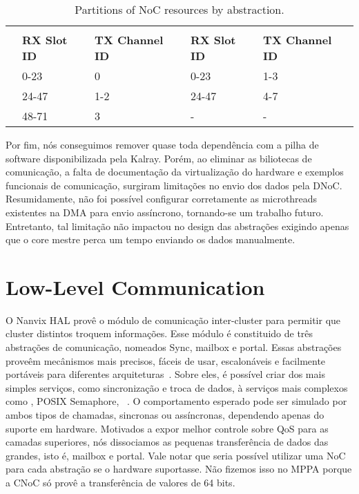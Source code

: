 		\begin{table}[!tb]
			\centering%
			\caption{Partitions of NoC resources by abstraction.}%
			\label{tab.noc-resources}%

			\begin{tabular}{l|l|l|l|l|}
				\cline{2-5}
														& \multicolumn{2}{c|}{\textbf{\cnoc}}          & \multicolumn{2}{c|}{\textbf{\dnoc}}          \\ \cline{2-5}
														& \textbf{RX Slot ID} & \textbf{TX Channel ID} & \textbf{RX Slot ID} & \textbf{TX Channel ID} \\ \hline
				\multicolumn{1}{|l|}{\textbf{\mailbox}} & 0-23                & 0                      & 0-23                & 1-3                    \\ \hline
				\multicolumn{1}{|l|}{\textbf{\portal}}  & 24-47               & 1-2                    & 24-47               & 4-7                    \\ \hline
				\multicolumn{1}{|l|}{\textbf{\sync}}    & 48-71               & 3                      & -                   & -                      \\ \hline
			\end{tabular}

		\end{table}

		Por fim, nós conseguimos remover quase toda dependência com a pilha de software disponibilizada pela Kalray.
		Porém, ao eliminar as biliotecas de comunicação, a falta de documentação da virtualização do hardware e exemplos funcionais de comunicação, surgiram limitações no envio dos dados pela DNoC.
		Resumidamente, não foi possível configurar corretamente as microthreads existentes na DMA para envio assíncrono, tornando-se um trabalho futuro.
		Entretanto, tal limitação não impactou no design das abstrações exigindo apenas que o core mestre perca um tempo enviando os dados manualmente.

	\section{Low-Level Communication}
	\label{sec.low-level-comm}

		O Nanvix HAL provê o módulo de comunicação inter-cluster para permitir que cluster distintos troquem informações.
		Esse módulo é constituido de três abstrações de comunicação, nomeados Sync, mailbox e portal.
		Essas abstrações proveêm mecânismos mais precisos, fáceis de usar, escalonáveis e facilmente portáveis para diferentes arquiteturas~\cite{wentzlaff_fleets:_2011}.
		Sobre eles, é possível criar dos mais simples serviços, como sincronização e troca de dados, à serviços mais complexos como \shm, POSIX Semaphore, \rmem~\cite{penna:rmen}.
		O comportamento esperado pode ser simulado por ambos tipos de chamadas, sincronas ou assíncronas, dependendo apenas do suporte em hardware.
		Motivados a expor melhor controle sobre QoS para as camadas superiores, nós dissociamos as pequenas transferência de dados das grandes, isto é, mailbox e portal.
		Vale notar que seria possível utilizar uma NoC para cada abstração se o hardware suportasse.
		Não fizemos isso no MPPA porque a CNoC só provê a transferência de valores de 64 bits.

